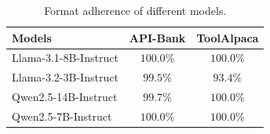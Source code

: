 \begin{table}[t]
\centering
\small
\begin{tabular}{@{}lcc@{}}
\toprule
\bf Models & \bf API-Bank & \bf ToolAlpaca \\\midrule
Llama-3.1-8B-Instruct &$100.0\%$ &$100.0\%$\\
Llama-3.2-3B-Instruct &$99.5\%$ &$93.4\%$\\
Qwen2.5-14B-Instruct &$99.7\%$ &$100.0\%$\\
Qwen2.5-7B-Instruct &$100.0\%$ &$100.0\%$\\
\bottomrule
\end{tabular}%
\caption{Format adherence of different models.}
\label{tab:format_adherence}
\end{table}